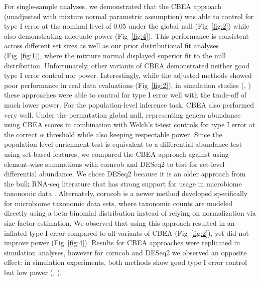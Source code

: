 \documentclass[10pt,letterpaper]{article}
\begin{document}
For single-sample analyses, we demonstrated that the CBEA approach (unadjusted with mixture normal parametric assumption) was able to control for type I error at the nominal level of 0.05 under the global null (Fig~\ref{fig:2}) while also demonstrating adequate power (Fig~\ref{fig:4}). This performance is consistent across different set sizes as well as our prior distributional fit analyses (Fig~\ref{fig:1}), where the mixture normal displayed superior fit to the null distribution. Unfortunately, other variants of CBEA demonstrated neither good type I error control nor power. Interestingly, while the adjusted methods showed poor performance in real data evaluations (Fig~\ref{fig:2}), in simulation studies (, ) these approaches were able to control for type I error well with the trade-off of much lower power. 
For the population-level inference task, CBEA also performed very well. Under the permutation global null, representing genera abundance using CBEA scores in combination with Welch's t-test controls for type I error at the correct $\alpha$ threshold while also keeping respectable power. Since the population level enrichment test is equivalent to a differential abundance test using set-based features, we compared the CBEA approach against using element-wise summations with corncob \cite{martin2020} and DESeq2 \cite{love2014} to test for set-level differential abundance. We chose DESeq2 because it is an older approach from the bulk RNA-seq literature that has strong support for usage in microbiome taxonomic data \cite{mcmurdie2014}. Alternately, corncob is a newer method developed specifically for microbiome taxonomic data sets, where taxonomic counts are modeled directly using a beta-binomial distribution instead of relying on normalization via size factor estimation. We observed that using this approach resulted in an inflated type I error compared to all variants of CBEA (Fig~\ref{fig:2}), yet did not improve power (Fig~\ref{fig:4}). Results for CBEA approaches were replicated in simulation analyses, however for corncob and DESeq2 we observed an opposite effect: in simulation experiments, both methods show good type I error control but low power (, ).  
\end{document}
